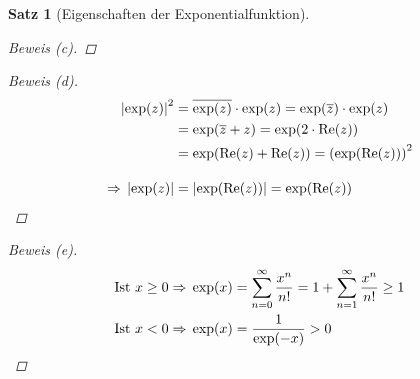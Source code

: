 \documentclass[11pt, twoside, a4paper]{article}
\theoremstyle{plain}
\newtheorem{satz}[blockelement]{Satz}
\newcommand{\pair}[1]{\left(#1\right)}
\newcommand{\abs}[1]{\left|#1\right|}
\newcommand{\impl}[0]{\Rightarrow{}}
\renewcommand{\Re}{\text{Re}}
\newcommand{\conj}[1]{\overline{#1}}
\begin{document}
\begin{satz}[Eigenschaften der Exponentialfunktion]
\begin{proof}[Beweis (c)]
        \end{proof}
        \begin{proof}[Beweis (d)]
            \begin{align*}
                \abs{\exp(z)}^2 &= \conj{\exp(z)}\cdot \exp(z) = \exp(\conj{z})\cdot \exp(z)\\
                &= \exp(\conj{z} + z) = \exp(2\cdot \Re(z))\\
                &=\exp(\Re(z)+ \Re(z)) = \pair{\exp(\Re(z))}^2\\[10pt]
                \impl \abs{\exp(z)} &= \abs{\exp(\Re(z))} = \exp(\Re(z))\qedhere
            \end{align*}
        \end{proof}
        \begin{proof}[Beweis (e)]
            \begin{align*}
                \text{Ist } x \geq 0 &\impl \exp(x) = \sum_{n=0}^{\infty} \frac{x^n}{n!}= 1 + \sum_{n=1}^{\infty} \frac{x^n}{n!}\geq 1\\
                \text{Ist } x < 0 &\impl \exp(x) = \frac{1}{\exp(-x)} > 0\qedhere
            \end{align*}
        \end{proof}
    \end{satz}
\end{document}
